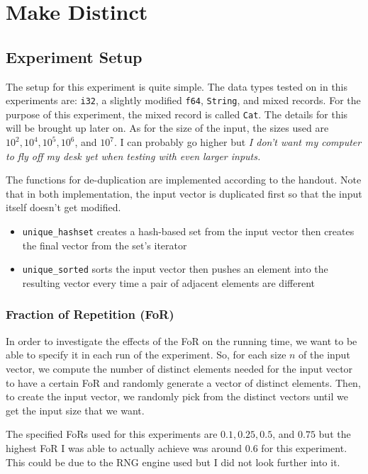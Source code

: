 \chapter{Make Distinct}

\section{Experiment Setup}

The setup for this experiment is quite simple. The data types tested on in this experiments are:
\texttt{i32}, a slightly modified \texttt{f64}, \texttt{String}, and mixed records. 
For the purpose of this experiment, the mixed record is called \texttt{Cat}. The details for this will be brought up later on.
As for the size of the input, the sizes used are $10^2, 10^4, 10^5, 10^6$, and $10^7$. I can probably go higher but \textit{I don't want my computer to fly off my desk yet when testing with even larger inputs.}

The functions for de-duplication are implemented according to the handout. Note that in both implementation, the input vector is duplicated first so that the input itself doesn't get modified.
\begin{itemize}
\item \texttt{unique_hashset} creates a hash-based set from the input vector then creates the final vector from the set's iterator
\item \texttt{unique_sorted} sorts the input vector then pushes an element into the resulting vector every time a pair of adjacent elements are different
\end{itemize}

\subsection*{Fraction of Repetition (FoR)}

In order to investigate the effects of the FoR on the running time, we want to be able to specify it in each run of the experiment.
So, for each size $n$ of the input vector, we compute the number of distinct elements needed for the input vector to have a certain FoR and randomly generate a vector of distinct elements. Then, to create the input vector, we randomly pick from the distinct vectors until we get the input size that we want.

The specified FoRs used for this experiments are $0.1, 0.25, 0.5$, and $0.75$ but the highest FoR I was able to actually achieve was around 0.6 for this experiment. This could be due to the RNG engine used but I did not look further into it.

